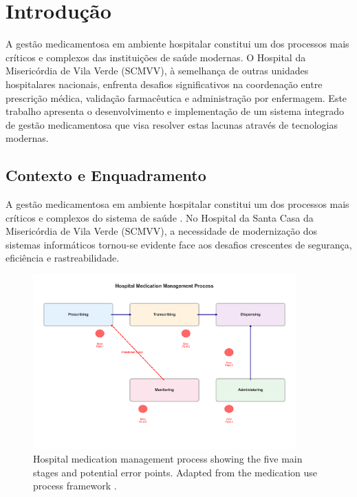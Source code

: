 \chapter{Introdução}

A gestão medicamentosa em ambiente hospitalar constitui um dos processos mais críticos e complexos das instituições de saúde modernas. O Hospital da Misericórdia de Vila Verde (SCMVV), à semelhança de outras unidades hospitalares nacionais, enfrenta desafios significativos na coordenação entre prescrição médica, validação farmacêutica e administração por enfermagem. Este trabalho apresenta o desenvolvimento e implementação de um sistema integrado de gestão medicamentosa que visa resolver estas lacunas através de tecnologias modernas.

\section{Contexto e Enquadramento}

A gestão medicamentosa em ambiente hospitalar constitui um dos processos mais críticos e complexos do sistema de saúde \cite{kohn2000,berwick2008}. No Hospital da Santa Casa da Misericórdia de Vila Verde (SCMVV), a necessidade de modernização dos sistemas informáticos tornou-se evidente face aos desafios crescentes de segurança, eficiência e rastreabilidade.

\begin{figure}[htbp]
    \centering
    \includegraphics[width=0.9\textwidth]{images/generated/medication_flow_process.png}
    \caption{Hospital medication management process showing the five main stages and potential error points. Adapted from the medication use process framework \citep{austin2018,zheng2021}.}
    \label{fig:medication_flow}
\end{figure}

